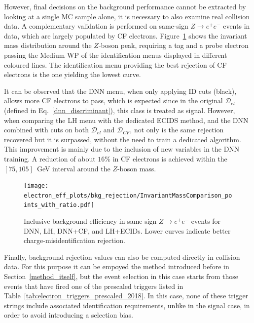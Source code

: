 
However, final decisions on the background performance cannot be extracted by looking at a single MC sample alone, it is necessary to also examine real collision data. A complementary validation is performed on same-sign $Z\to e^{+}e^{-}$ events in data, which are largely populated by CF electrons. Figure~\ref{fig:cf_bkg_data} shows the invariant mass distribution around the $Z$-boson peak, requiring a tag and a probe electron passing the Medium WP of the identification menus displayed in different coloured lines. The identification menu providing the best rejection of CF electrons is the one yielding the lowest curve. 

It can be observed that the DNN menu, when only applying ID cuts (black), allows more CF electrons to pass, which is expected since in the original $\mathcal{D}_{el}$ (defined in Eq.~\ref{dnn_discriminant}), this class is treated as signal. However, when comparing the LH menu with the dedicated ECIDS method, and the DNN combined with cuts on both $\mathcal{D}_{el}$ and $\mathcal{D}_{CF}$, not only is the same rejection recovered but it is surpassed, without the need to train a dedicated algorithm. This improvement is mainly due to the inclusion of new variables in the DNN training. A reduction of about $16\%$ in CF electrons is achieved within the $[75,105]$~GeV interval around the $Z$-boson mass.

\begin{figure}[htbp]
  \centering
  \texttt{[image: electron\_eff\_plots/bkg\_rejection/InvariantMassComparison\_points\_with\_ratio.pdf]}
  \caption{Inclusive background efficiency in same-sign $Z\to e^{+}e^{-}$ events for DNN, LH, DNN+CF, and LH+ECIDs. Lower curves indicate better charge-misidentification rejection.}
  \label{fig:cf_bkg_data}
\end{figure}

Finally, background rejection values can also be computed directly in collision data. 
For this purpose it can be empoyed the \zmass method introduced before in Section~\ref{method_itself}, but the event selection in this case starts from those events that have fired one of the prescaled triggers listed in Table~\ref{tab:electron_triggers_prescaled_2018}.  
In this case, none of these trigger strings include associated identification requirements, unlike in the signal case, in order to avoid introducing a selection bias.

